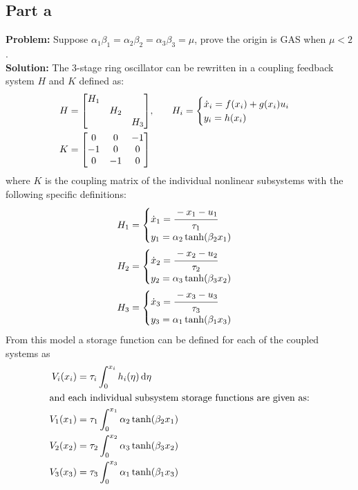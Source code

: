 \documentclass[letter]{article}
\begin{document}
\subsection{Part a}
\textbf{Problem:}
Suppose $\alpha_1 \beta_1 = \alpha_2 \beta_2 = \alpha_3 \beta_3 = \mu$, prove the origin is GAS when $\mu < 2$.\\

\noindent
\textbf{Solution:}
The 3-stage ring oscillator can be rewritten in a coupling feedback system $H$ and $K$ defined as:
\begin{align}
	H &= \mqty[\dmat{H_1}{H_2}{H_3}], \hspace{0.25in}
	H_i
	=\begin{cases}
		\dot{x}_i = f(x_i) + g(x_i) u_i\\
		y_i = h(x_i)
	\end{cases}\\
	K &= \mqty[	 0 	& 0 &-1\\
				-1 	& 0 & 0\\
				0 	&-1 & 0]
\end{align}
where $K$ is the coupling matrix of the individual nonlinear subsystems with the following specific definitions:
\begin{align}
	H_1 &=\begin{cases}
		\dot{x}_1 = \cfrac{-x_1 - u_1}{\tau_1}\\
		y_1 = \alpha_2 \tanh(\beta_2 x_1)
	\end{cases}\\
	H_2 &=\begin{cases}
		\dot{x}_2 = \cfrac{-x_2 - u_2}{\tau_2}\\
		y_2 = \alpha_3 \tanh(\beta_3 x_2)
	\end{cases}\\
	H_3 &=\begin{cases}
		\dot{x}_3 = \cfrac{-x_3 - u_3}{\tau_3}\\
		y_3 = \alpha_1 \tanh(\beta_1 x_3)
	\end{cases}
\end{align}
From this model a storage function can be defined for each of the coupled systems as
\begin{align}
	V_i(x_i) &= \tau_i \int_0^{x_i} h_i(\eta) \dd{\eta}\\
	\intertext{and each individual subsystem storage functions are given as:}
	V_1(x_1) &= \tau_1 \int_0^{x_1} \alpha_2 \tanh(\beta_2 x_1)\\
	V_2(x_2) &= \tau_2 \int_0^{x_2} \alpha_3 \tanh(\beta_3 x_2)\\
	V_3(x_3) &= \tau_3 \int_0^{x_3} \alpha_1 \tanh(\beta_1 x_3)
\end{align}
\end{document}

